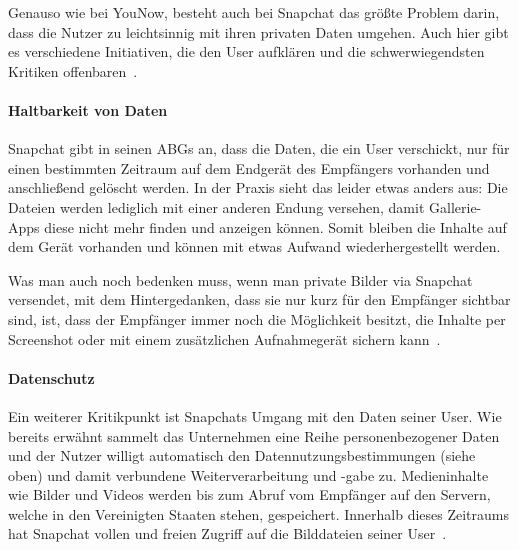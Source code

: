 Genauso wie bei YouNow, besteht auch bei Snapchat das gr\"o{\ss}te Problem
darin, dass die Nutzer zu leichtsinnig mit ihren privaten Daten umgehen. Auch
hier gibt es verschiedene Initiativen, die den User aufkl\"aren und die
schwerwiegendsten Kritiken offenbaren~\cite{sc_risiken}. 

\paragraph{Haltbarkeit von Daten}
Snapchat gibt in seinen ABGs an, dass die Daten, die ein User verschickt, nur
f\"ur einen bestimmten Zeitraum auf dem Endger\"at des Empf\"angers vorhanden
und anschlie{\ss}end gel\"oscht werden. In der Praxis sieht das leider etwas
anders aus: Die Dateien werden lediglich mit einer anderen Endung versehen,
damit Gallerie-Apps diese nicht mehr finden und anzeigen k\"onnen. Somit
bleiben die Inhalte auf dem Ger\"at vorhanden und k\"onnen mit etwas Aufwand
wiederhergestellt werden.

Was man auch noch bedenken muss, wenn man private Bilder via Snapchat
versendet, mit dem Hintergedanken, dass sie nur kurz f\"ur den Empf\"anger
sichtbar sind, ist, dass der Empf\"anger immer noch die M\"oglichkeit besitzt,
die Inhalte per Screenshot oder mit einem zus\"atzlichen Aufnahmeger\"at
sichern kann~\cite{sc_risiken}.

\paragraph{Datenschutz}
Ein weiterer Kritikpunkt ist Snapchats Umgang mit den Daten seiner User. Wie
bereits erw\"ahnt sammelt das Unternehmen eine Reihe personenbezogener Daten
und der Nutzer willigt automatisch den Datennutzungsbestimmungen (siehe oben)
und damit verbundene Weiterverarbeitung und -gabe zu. Medieninhalte wie Bilder
und Videos werden bis zum Abruf vom Empf\"anger auf den Servern, welche in den
Vereinigten Staaten stehen, gespeichert. Innerhalb dieses Zeitraums hat
Snapchat vollen und freien Zugriff auf die Bilddateien seiner
User~\cite{sc_risiken}.
